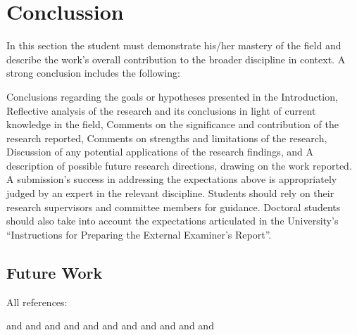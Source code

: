 \chapter{Conclussion}
\label{conclussion}

In this section the student must demonstrate his/her mastery of the field and describe the work's overall contribution to the broader discipline in context. A strong conclusion includes the following:

Conclusions regarding the goals or hypotheses presented in the Introduction,
Reflective analysis of the research and its conclusions in light of current knowledge in the field,
Comments on the significance and contribution of the research reported,
Comments on strengths and limitations of the research,
Discussion of any potential applications of the research findings, and
A description of possible future research directions, drawing on the work reported.
A submission's success in addressing the expectations above is appropriately judged by an expert in the relevant discipline. Students should rely on their research supervisors and committee members for guidance. Doctoral students should also take into account the expectations articulated in the University's “Instructions for Preparing the External Examiner's Report”.

\section{Future Work}
All references:

\citep{article:01:visual} and \citep{article:02:laser} and \citep{article:03:motorsignals} and \citep{article:04:onlinelearning} and \citep{thesis:05:proprioception} and \citep{article:06:haptic} and \citep{thesis:07:proprioception} and \citep{article:08:rhex} and \citep{article:09:roughterrain} and \citep{article:10:pruningalgs} and \citep{book:11:scorpion} and \citep{thesis:12:gaitcontrol}